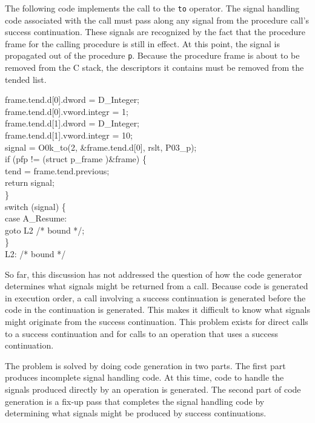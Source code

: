 The following code implements the call to the \texttt{to}
operator. The signal handling code associated with the call must pass
along any signal from the procedure call's success continuation. These
signals are recognized by the fact that the procedure frame for the
calling procedure is still in effect. At this point, the signal is
propagated out of the procedure \texttt{p}. Because the procedure
frame is about to be removed from the C stack, the descriptors it
contains must be removed from the tended list.

\goodbreak
\begin{iconcode}
frame.tend.d[0].dword = D\_Integer;\\
frame.tend.d[0].vword.integr = 1;\\
frame.tend.d[1].dword = D\_Integer;\\
frame.tend.d[1].vword.integr = 10;\\
signal = O0k\_to(2, \&frame.tend.d[0], rslt, P03\_p);\\
if (pfp != (struct p\_frame )\&frame) \{\\
\>tend = frame.tend.previous;\\
\>return signal;\\
\>\}\\
switch (signal) \{\\
\>case A\_Resume:\\
\>\>goto L2 /* bound */;\\
\>\}\\
L2: /* bound */\\
\end{iconcode}


So far, this discussion has not addressed the question of how the code
generator determines what signals might be returned from a
call. Because code is generated in execution order, a call involving a
success continuation is generated before the code in the continuation
is generated. This makes it difficult to know what signals might
originate from the success continuation. This problem exists for
direct calls to a success continuation and for calls to an operation
that uses a success continuation.

The problem is solved by doing code generation in two parts. The first
part produces incomplete signal handling code. At this time, code to
handle the signals produced directly by an operation is generated. The
second part of code generation is a fix-up pass that completes the
signal handling code by determining what signals might be produced by
success continuations.

